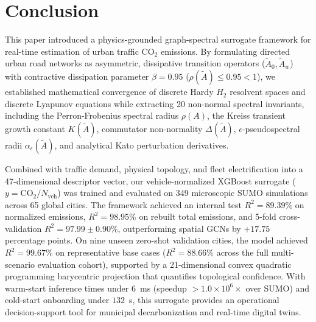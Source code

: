 \documentclass[journal]{IEEEtran}
\begin{document}
\section{Conclusion}

This paper introduced a physics-grounded graph-spectral surrogate framework for real-time estimation of urban traffic $\text{CO}_2$ emissions. By formulating directed urban road networks as asymmetric, dissipative transition operators ($\tilde{A}_0, \tilde{A}_w$) with contractive dissipation parameter $\beta = 0.95$ ($\rho(\tilde{A}) \le 0.95 < 1$), we established mathematical convergence of discrete Hardy $H_2$ resolvent spaces and discrete Lyapunov equations while extracting 20 non-normal spectral invariants, including the Perron-Frobenius spectral radius $\rho(A)$, the Kreiss transient growth constant $K(\tilde{A})$, commutator non-normality $\Delta(\tilde{A})$, $\epsilon$-pseudospectral radii $\alpha_\epsilon(\tilde{A})$, and analytical Kato perturbation derivatives.

Combined with traffic demand, physical topology, and fleet electrification into a 47-dimensional descriptor vector, our vehicle-normalized XGBoost surrogate ($y = \text{CO}_2 / N_{\text{veh}}$) was trained and evaluated on 349 microscopic SUMO simulations across 65 global cities. The framework achieved an internal test $R^2 = 89.39\%$ on normalized emissions, $R^2 = 98.95\%$ on rebuilt total emissions, and 5-fold cross-validation $R^2 = 97.99 \pm 0.90\%$, outperforming spatial GCNs by $+17.75$ percentage points. On nine unseen zero-shot validation cities, the model achieved $R^2 = 99.67\%$ on representative base cases ($R^2 = 88.66\%$ across the full multi-scenario evaluation cohort), supported by a 21-dimensional convex quadratic programming barycentric projection that quantifies topological confidence. With warm-start inference times under $6$~ms (speedup $> 1.0 \times 10^6 \times$ over SUMO) and cold-start onboarding under $132$~s, this surrogate provides an operational decision-support tool for municipal decarbonization and real-time digital twins.
\end{document}
